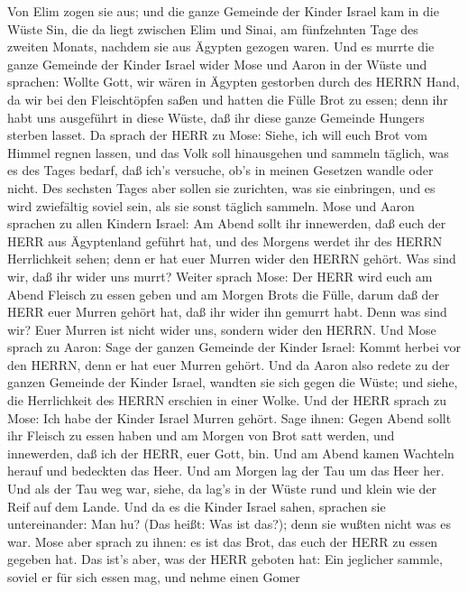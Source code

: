  Von Elim zogen sie aus; und die ganze Gemeinde der Kinder
Israel kam in die Wüste Sin, die da liegt zwischen Elim und Sinai, am
fünfzehnten Tage des zweiten Monats, nachdem sie aus Ägypten gezogen
waren.  Und es murrte die ganze Gemeinde der Kinder Israel
wider Mose und Aaron in der Wüste  und sprachen: Wollte
Gott, wir wären in Ägypten gestorben durch des HERRN Hand, da wir bei
den Fleischtöpfen saßen und hatten die Fülle Brot zu essen; denn ihr
habt uns ausgeführt in diese Wüste, daß ihr diese ganze Gemeinde Hungers
sterben lasset.  Da sprach der HERR zu Mose: Siehe, ich will
euch Brot vom Himmel regnen lassen, und das Volk soll hinausgehen und
sammeln täglich, was es des Tages bedarf, daß ich's versuche, ob's in
meinen Gesetzen wandle oder nicht.  Des sechsten Tages aber
sollen sie zurichten, was sie einbringen, und es wird zwiefältig soviel
sein, als sie sonst täglich sammeln.  Mose und Aaron
sprachen zu allen Kindern Israel: Am Abend sollt ihr innewerden, daß
euch der HERR aus Ägyptenland geführt hat,  und des Morgens
werdet ihr des HERRN Herrlichkeit sehen; denn er hat euer Murren wider
den HERRN gehört. Was sind wir, daß ihr wider uns murrt? 
Weiter sprach Mose: Der HERR wird euch am Abend Fleisch zu essen geben
und am Morgen Brots die Fülle, darum daß der HERR euer Murren gehört
hat, daß ihr wider ihn gemurrt habt. Denn was sind wir? Euer Murren ist
nicht wider uns, sondern wider den HERRN.  Und Mose sprach
zu Aaron: Sage der ganzen Gemeinde der Kinder Israel: Kommt herbei vor
den HERRN, denn er hat euer Murren gehört.  Und da Aaron
also redete zu der ganzen Gemeinde der Kinder Israel, wandten sie sich
gegen die Wüste; und siehe, die Herrlichkeit des HERRN erschien in einer
Wolke.  Und der HERR sprach zu Mose:  Ich habe
der Kinder Israel Murren gehört. Sage ihnen: Gegen Abend sollt ihr
Fleisch zu essen haben und am Morgen von Brot satt werden, und
innewerden, daß ich der HERR, euer Gott, bin.  Und am Abend
kamen Wachteln herauf und bedeckten das Heer. Und am Morgen lag der Tau
um das Heer her.  Und als der Tau weg war, siehe, da lag's
in der Wüste rund und klein wie der Reif auf dem Lande. 
Und da es die Kinder Israel sahen, sprachen sie untereinander: Man hu?
(Das heißt: Was ist das?); denn sie wußten nicht was es war. Mose aber
sprach zu ihnen: es ist das Brot, das euch der HERR zu essen gegeben
hat.  Das ist's aber, was der HERR geboten hat: Ein
jeglicher sammle, soviel er für sich essen mag, und nehme einen Gomer
